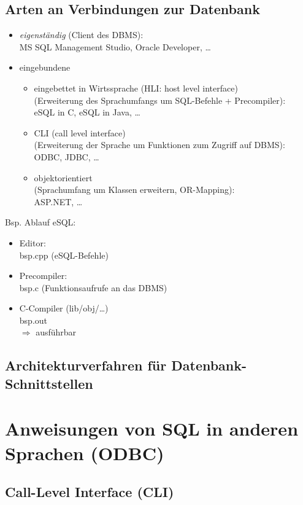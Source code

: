 \subsection{Arten an Verbindungen zur Datenbank}
\begin{itemize}
\item \emph{eigenständig} (Client des DBMS):\\
MS SQL Management Studio, Oracle Developer, …
\item eingebundene
\begin{itemize}
\item eingebettet in Wirtssprache (HLI: host level interface) \\
(Erweiterung des Sprachumfangs um SQL-Befehle + Precompiler):\\
eSQL in C, eSQL in Java, …
\item CLI (call level interface)\\
(Erweiterung der Sprache um Funktionen zum Zugriff auf DBMS):\\
ODBC, JDBC, …
\item objektorientiert\\
(Sprachumfang um Klassen erweitern, OR-Mapping):\\
ASP.NET, …
\end{itemize}
\end{itemize}

Bsp. Ablauf eSQL:
\begin{itemize}
\item Editor:\\
bsp.cpp	(eSQL-Befehle)
\item Precompiler:\\
bsp.c (Funktionsaufrufe an das DBMS)
\item C-Compiler (lib/obj/…)\\
bsp.out\\
$\Rightarrow$ ausführbar
\end{itemize}

\subsection{Architekturverfahren für Datenbank-Schnittstellen}

\section{Anweisungen von SQL in anderen Sprachen (ODBC)}
\subsection{Call-Level Interface (CLI)}
